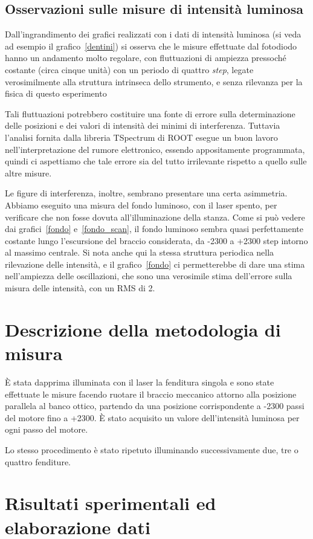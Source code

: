 \documentclass[italian,a4paper]{article}
\begin{document}
\subsection*{Osservazioni sulle misure di intensità luminosa}
Dall'ingrandimento dei grafici realizzati con i dati di intensità luminosa (si veda ad esempio il grafico~\ref{dentini}) si osserva che le misure effettuate dal fotodiodo hanno un andamento molto regolare, con fluttuazioni di ampiezza pressoché costante (circa cinque unità) con un periodo di quattro \emph{step}, legate verosimilmente alla struttura intrinseca dello strumento, e senza rilevanza per la fisica di questo esperimento

Tali fluttuazioni potrebbero costituire una fonte di errore sulla determinazione delle posizioni e dei valori di intensità dei minimi di interferenza. Tuttavia l'analisi fornita dalla libreria TSpectrum di ROOT esegue un buon lavoro nell'interpretazione del rumore elettronico, essendo appositamente programmata, quindi ci aspettiamo che tale errore sia del tutto irrilevante rispetto a quello sulle altre misure.

Le figure di interferenza, inoltre, sembrano presentare una certa asimmetria. Abbiamo eseguito una misura del fondo luminoso, con il laser spento, per verificare che non fosse dovuta all'illuminazione della stanza. Come si può vedere dai grafici~\ref{fondo} e~\ref{fondo_scan}, il fondo luminoso sembra quasi perfettamente costante lungo l'escursione del braccio considerata, da -2300 a +2300 step intorno al massimo centrale. Si nota anche qui la stessa struttura periodica nella rilevazione delle intensità, e il grafico~\ref{fondo} ci permetterebbe di dare una stima nell'ampiezza delle oscillazioni, che sono una verosimile stima dell'errore sulla misura delle intensità, con un RMS di 2.

\section{Descrizione della metodologia di misura}
\`{E} stata dapprima illuminata con il laser la fenditura singola e sono state effettuate le misure facendo ruotare il braccio meccanico attorno alla posizione parallela al banco ottico, partendo da una posizione corrispondente a -2300 passi del motore fino a +2300. \`{E} stato acquisito un valore dell'intensità luminosa per ogni passo del motore.

Lo stesso procedimento è stato ripetuto illuminando successivamente due, tre o quattro fenditure.
\section{Risultati sperimentali ed elaborazione dati}
\end{document}
